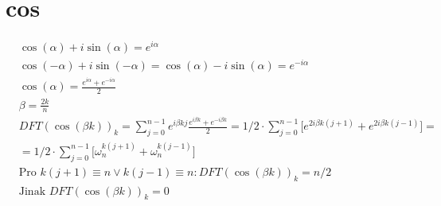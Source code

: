 \documentclass[a4paper]{article}
\begin{document}
\renewcommand{\headrulewidth}{0pt} %
\thispagestyle{fancy} %
{}

\section*{cos}
\begin{align*}
	& \cos(\alpha) + i\sin(\alpha) = e^{i\alpha} \\
	& \cos(-\alpha) + i\sin(-\alpha) = \cos(\alpha) - i\sin(\alpha) = e^{-i\alpha} \\
	& \cos(\alpha) = \frac{e^{i\alpha} +  e^{-i\alpha}}{2} \\
	& \beta = \frac{2k}{n} \\
	& DFT(\cos(\beta k))_k = \sum_{j=0}^{n-1} e^{i \beta kj} \frac{e^{i \beta k} +  e^{-i \beta k}}{2} = 1/2 \cdot \sum_{j=0}^{n-1} \big[ e^{2i \beta k (j+1)} + e^{2i \beta k (j-1)}\big] = \\
	& = 1/2 \cdot \sum_{j=0}^{n-1} \big[  \omega_n^{k(j+1)} + \omega_n^{k(j-1)} \big] \\
	& \text{Pro } k(j+1) \equiv n \vee k(j-1) \equiv n: DFT(\cos(\beta k))_k = n/2 \\
	& \text{Jinak }  DFT(\cos(\beta k))_k = 0
\end{align*}
\end{document}

